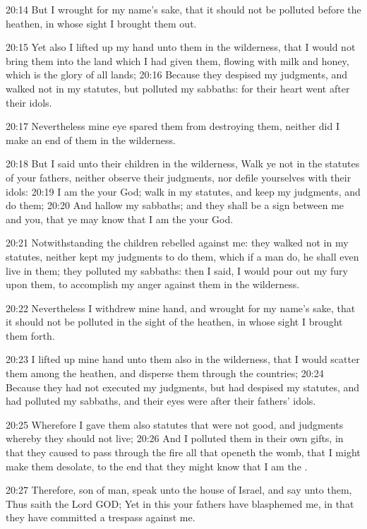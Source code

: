 20:14 But I wrought for my name's sake, that it should not be polluted
before the heathen, in whose sight I brought them out.

20:15 Yet also I lifted up my hand unto them in the wilderness, that I
would not bring them into the land which I had given them, flowing
with milk and honey, which is the glory of all lands; 20:16 Because
they despised my judgments, and walked not in my statutes, but
polluted my sabbaths: for their heart went after their idols.

20:17 Nevertheless mine eye spared them from destroying them, neither
did I make an end of them in the wilderness.

20:18 But I said unto their children in the wilderness, Walk ye not in
the statutes of your fathers, neither observe their judgments, nor
defile yourselves with their idols: 20:19 I am the \LORD your God; walk
in my statutes, and keep my judgments, and do them; 20:20 And hallow
my sabbaths; and they shall be a sign between me and you, that ye may
know that I am the \LORD your God.

20:21 Notwithstanding the children rebelled against me: they walked
not in my statutes, neither kept my judgments to do them, which if a
man do, he shall even live in them; they polluted my sabbaths: then I
said, I would pour out my fury upon them, to accomplish my anger
against them in the wilderness.

20:22 Nevertheless I withdrew mine hand, and wrought for my name's
sake, that it should not be polluted in the sight of the heathen, in
whose sight I brought them forth.

20:23 I lifted up mine hand unto them also in the wilderness, that I
would scatter them among the heathen, and disperse them through the
countries; 20:24 Because they had not executed my judgments, but had
despised my statutes, and had polluted my sabbaths, and their eyes
were after their fathers' idols.

20:25 Wherefore I gave them also statutes that were not good, and
judgments whereby they should not live; 20:26 And I polluted them in
their own gifts, in that they caused to pass through the fire all that
openeth the womb, that I might make them desolate, to the end that
they might know that I am the \LORD.

20:27 Therefore, son of man, speak unto the house of Israel, and say
unto them, Thus saith the Lord GOD; Yet in this your fathers have
blasphemed me, in that they have committed a trespass against me.

